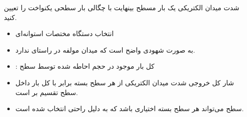\begin{ELexample}{}

شدت میدان الکتریکی یک بار مسطح بینهایت با چگالی بار سطحی یکنواخت  را تعیین کنید.


\begin{ELsolution}


\begin{itemize}
\tightlist
\item
  انتخاب دستگاه مختصات استوانه‌ای
\end{itemize}


\begin{itemize}
\tightlist
\item
  به صورت شهودی واضح است که میدان مولفه در راستای  ندارد.
\end{itemize}


\end{ELsolution}

\end{ELexample}

\ELhold


\begin{ELunit}


\end{ELunit}

\begin{ELimportant}{}


\end{ELimportant}

\begin{ELunit}

\begin{itemize}
\tightlist
\item
  : کل بار موجود در حجم  احاطه شده توسط سطح 
\item
  شار کل خروجی شدت میدان الکتریکی از هر سطح بسته برابر با کل بار داخل سطح تقسیم بر  است.
\item
  سطح  می‌تواند هر سطح بسته اختیاری باشد که به دلیل راحتی انتخاب شده است.
\end{itemize}

\end{ELunit}

